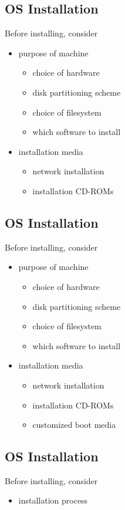 \documentclass[xga]{xdvislides}
\begin{document}
\subsection{OS Installation}
Before installing, consider
\begin{itemize}
	\item purpose of machine
		\begin{itemize}
			\item choice of hardware
			\item disk partitioning scheme
			\item choice of filesystem
			\item which software to install
		\end{itemize}
	\item installation media
		\begin{itemize}
			\item network installation
			\item installation CD-ROMs
		\end{itemize}
\end{itemize}

\subsection{OS Installation}
Before installing, consider
\begin{itemize}
	\item purpose of machine
		\begin{itemize}
			\item choice of hardware
			\item disk partitioning scheme
			\item choice of filesystem
			\item which software to install
		\end{itemize}
	\item installation media
		\begin{itemize}
			\item network installation
			\item installation CD-ROMs
			\item customized boot media
		\end{itemize}
\end{itemize}

\subsection{OS Installation}
Before installing, consider
\begin{itemize}
	\item installation process
\end{itemize}
\end{document}
